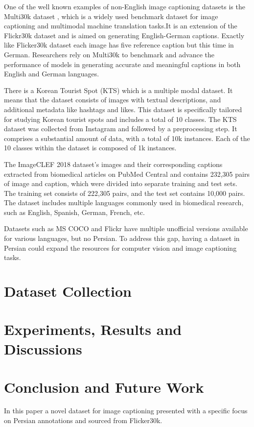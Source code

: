 \documentclass[runningheads]{llncs}
\begin{document}
One of the well known examples of non-English image captioning datasets is the Multi30k dataset \cite{Multi30k}, which is a widely used benchmark dataset for image captioning and multimodal machine translation tasks.It is an extension of the Flickr30k dataset \cite{Flickr30k} and is aimed on generating English-German captions. Exactly like Flicker30k dataset each image has five reference caption but this time in German. Researchers rely on Multi30k to benchmark and advance the performance of models in generating accurate and meaningful captions in both English and German languages.

There is a Korean Tourist Spot (KTS) \cite{Korean} which is a multiple modal dataset. It means that the dataset consists of images with textual descriptions, and additional metadata like hashtags and likes. This dataset is specifically tailored for studying Korean tourist spots and includes a total of 10 classes. The KTS dataset was collected from Instagram and followed by a preprocessing step. It comprises a substantial amount of data, with a total of 10k instances. Each of the 10 classes within the dataset is composed of 1k instances.

The ImageCLEF 2018 \cite{ImageCLEF2018} dataset's images and their corresponding captions extracted from biomedical articles on PubMed Central and contains 232,305 pairs of image and caption, which were divided into separate training and test sets. The training set consists of 222,305 pairs, and the test set contains 10,000 pairs. The dataset includes multiple languages commonly used in biomedical research, such as English, Spanish, German, French, etc.

Datasets such as MS COCO and Flickr have multiple unofficial versions available for various languages, but no Persian. To address this gap, having a dataset in Persian could 
expand the resources for computer vision and image captioning tasks. 

\section{Dataset Collection}

\section{Experiments, Results and Discussions}

\section{Conclusion and Future Work}
In this paper a novel dataset for image captioning presented with a specific focus on Persian annotations and sourced from Flicker30k.
\end{document}
